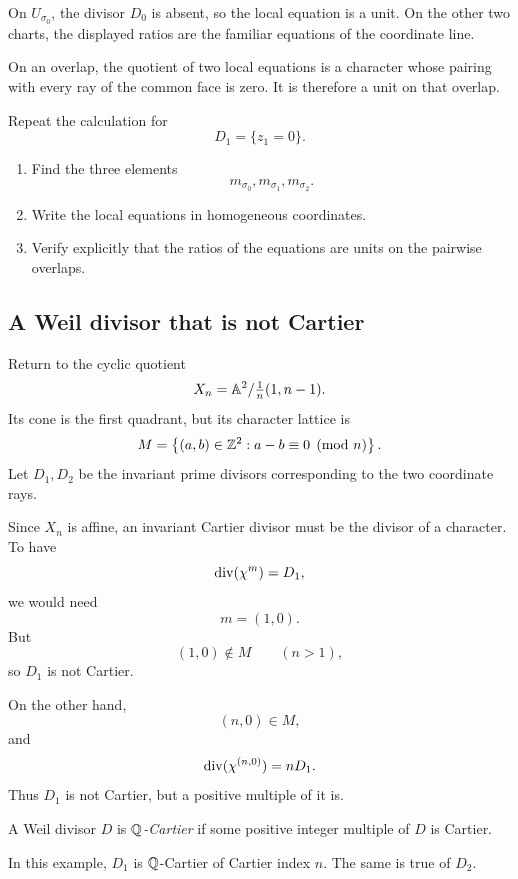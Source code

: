 On \(U_{\sigma_0}\), the divisor \(D_0\) is absent, so the local
equation is a unit. On the other two charts, the displayed ratios are
the familiar equations of the coordinate line.

On an overlap, the quotient of two local equations is a character
whose pairing with every ray of the common face is zero. It is
therefore a unit on that overlap.

\begin{surfacelaboratory}
Repeat the calculation for
\[
D_1=\{z_1=0\}.
\]

\begin{enumerate}[label=(\alph*),wide=0pt]
\item Find the three elements
\[
m_{\sigma_0},m_{\sigma_1},m_{\sigma_2}.
\]

\item Write the local equations in homogeneous coordinates.

\item Verify explicitly that the ratios of the equations are units on
the pairwise overlaps.
\end{enumerate}
\end{surfacelaboratory}

\subsection{A Weil divisor that is not Cartier}

Return to the cyclic quotient
\[
X_n
=
\mathbb{A}^2/\tfrac1n(1,n-1).
\]
Its cone is the first quadrant, but its character lattice is
\[
M
=
\left\{
(a,b)\in\mathbb{Z}^2:
a-b\equiv0\pmod n
\right\}.
\]
Let \(D_1,D_2\) be the invariant prime divisors corresponding to the
two coordinate rays.

Since \(X_n\) is affine, an invariant Cartier divisor must be the
divisor of a character. To have
\[
\operatorname{div}(\chi^{m})=D_1,
\]
we would need
\[
m=(1,0).
\]
But
\[
(1,0)\notin M
\qquad
(n>1),
\]
so \(D_1\) is not Cartier.

On the other hand,
\[
(n,0)\in M,
\]
and
\[
\operatorname{div}(\chi^{(n,0)})
=
nD_1.
\]
Thus \(D_1\) is not Cartier, but a positive multiple of it is.

\begin{definition}
A Weil divisor \(D\) is \emph{\(\mathbb{Q}\)-Cartier} if some positive
integer multiple of \(D\) is Cartier.
\end{definition}

In this example, \(D_1\) is \(\mathbb{Q}\)-Cartier of Cartier index \(n\).
The same is true of \(D_2\).


